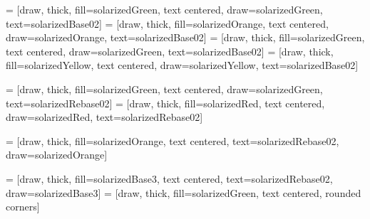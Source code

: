  = [draw, thick, fill=solarizedGreen, text centered, draw=solarizedGreen,
    text=solarizedBase02]
 = [draw, thick, fill=solarizedOrange, text centered, draw=solarizedOrange,
    text=solarizedBase02]
 = [draw, thick, fill=solarizedGreen, text centered, draw=solarizedGreen,
    text=solarizedBase02]
 = [draw, thick, fill=solarizedYellow, text centered, draw=solarizedYellow,
    text=solarizedBase02]

 = [draw, thick, fill=solarizedGreen, text centered, draw=solarizedGreen, text=solarizedRebase02]
 = [draw, thick, fill=solarizedRed, text centered, draw=solarizedRed, text=solarizedRebase02]

 = [draw, thick, fill=solarizedOrange, text centered, text=solarizedRebase02, draw=solarizedOrange]

 = [draw, thick, fill=solarizedBase3, text centered, text=solarizedRebase02, draw=solarizedBase3]
 = [draw, thick, fill=solarizedGreen, text centered, rounded corners]
